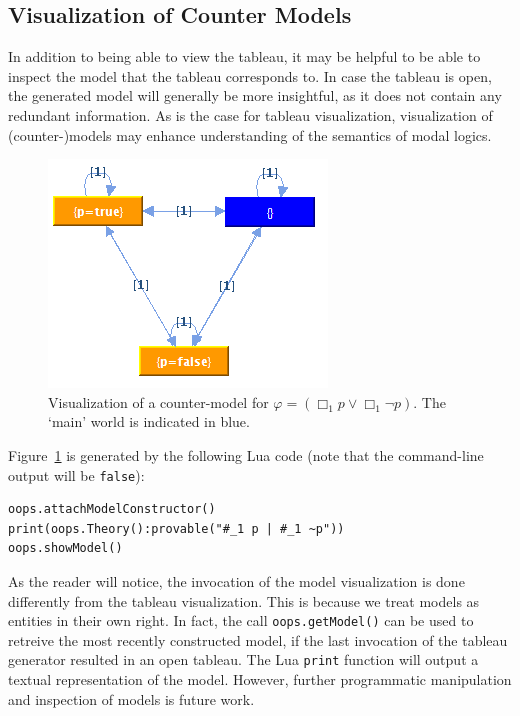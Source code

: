 \subsection{Visualization of Counter Models}

In addition to being able to view the tableau, it may be helpful to be able to
inspect the model that the tableau corresponds to.
In case the tableau is open, the generated model will generally be more
insightful, as it does not contain any redundant information.
As is the case for tableau visualization, visualization of (counter-)models may
enhance understanding of the semantics of modal logics.

\begin{figure}[p]
\centering
\includegraphics[scale=.55]{images/modelVis}
\caption{Visualization of a counter-model for $\varphi = (\Box_1 p \vee \Box_1
\neg p)$. The `main' world is indicated in blue.}
\label{fig:modelVis}
\end{figure}

Figure~\ref{fig:modelVis} is generated by the following Lua code (note that
the command-line output will be \lstinline!false!):
\begin{lstlisting}
oops.attachModelConstructor()
print(oops.Theory():provable("#_1 p | #_1 ~p"))
oops.showModel() 
\end{lstlisting}
As the reader will notice, the invocation of the model visualization is done
differently from the tableau visualization.
This is because we treat models as entities in their own right.
In fact, the call \lstinline!oops.getModel()!  can be used to retreive the most
recently constructed model, if the last invocation of the tableau generator
resulted in an open tableau.
The Lua \lstinline!print! function will output a textual representation of the
model.
However, further programmatic manipulation and inspection of models is future
work.
